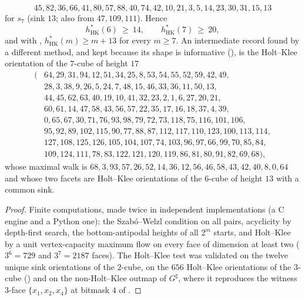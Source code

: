 \begin{proposition}
\[
 45,82,36,66,41,80,57,88,40,74,42,10,21,3,5,14,23,30,31,15,13
\]
for $s_7$ (sink $13$; also from $47,109,111$). Hence
\[
  h^{\ast}_{\mathrm{HK}}(6)\ \ge\ 14,\qquad
  h^{\ast}_{\mathrm{HK}}(7)\ \ge\ 20,
\]
and with ,
$h^{\ast}_{\mathrm{HK}}(m)\ge m+13$ for every $m\ge7$. An intermediate
record found by a different method, and kept because its shape is
informative (), is the Holt--Klee orientation of the
$7$-cube of height $17$
\[
\begin{aligned}
 (&64,29,31,94,12,51,34,25,8,53,54,55,52,59,42,49,\\
  &28,3,38,9,26,5,24,7,48,15,46,33,36,11,50,13,\\
  &44,45,62,63,40,19,10,41,32,23,2,1,6,27,20,21,\\
  &60,61,14,47,58,43,56,57,22,35,17,16,18,37,4,39,\\
  &0,65,67,30,71,76,93,98,79,72,73,118,75,116,101,106,\\
  &95,92,89,102,115,90,77,88,87,112,117,110,123,100,113,114,\\
  &127,108,125,126,105,104,107,74,103,96,97,66,99,70,85,84,\\
  &109,124,111,78,83,122,121,120,119,86,81,80,91,82,69,68),
\end{aligned}
\]
whose maximal walk is
$68,3,93,57,26,52,14,36,12,56,46,58,43,42,40,8,0,64$ and whose two facets
are Holt--Klee orientations of the $6$-cube of height $13$ with a common
sink.
\end{proposition}

\begin{proof}
Finite computations, made twice in independent implementations (a C engine
and a Python one): the Szab\'o--Welzl condition on all pairs, acyclicity by
depth-first search, the bottom-antipodal heights of all $2^{m}$ starts,
and Holt--Klee by a unit vertex-capacity maximum flow on every face of
dimension at least two ($3^{6}=729$ and $3^{7}=2187$ faces). The
Holt--Klee test was validated on the twelve unique sink orientations of the
$2$-cube, on the $656$ Holt--Klee orientations of the $3$-cube
() and on the non-Holt--Klee outmap of
$G^{\sharp}$, where it reproduces the witness $3$-face
$\{x_1,x_2,x_4\}$ at bitmask $4$ of .
\end{proof}

